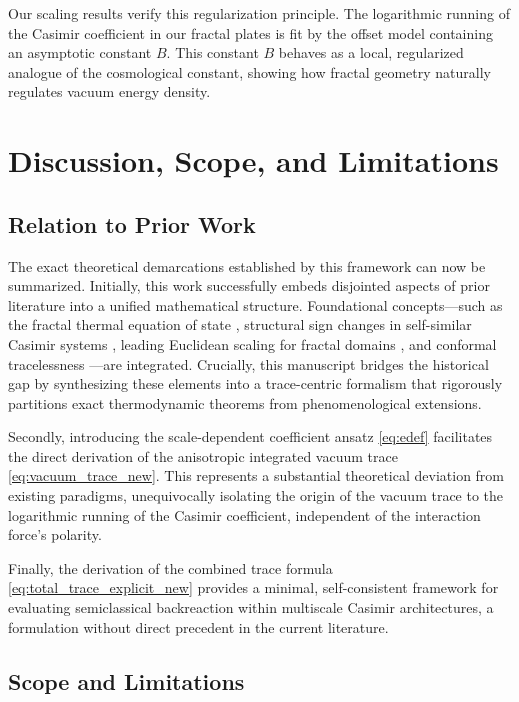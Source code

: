 \documentclass[12pt,letterpaper]{article}
\begin{document}
Our scaling results verify this regularization principle. The logarithmic running of the Casimir coefficient in our fractal plates is fit by the offset model containing an asymptotic constant $B$. This constant $B$ behaves as a local, regularized analogue of the cosmological constant, showing how fractal geometry naturally regulates vacuum energy density.


\section{Discussion, Scope, and Limitations}
\label{sec:discussion}

\subsection{Relation to Prior Work}

The exact theoretical demarcations established by this framework can now be summarized.
Initially, this work successfully embeds disjointed aspects of prior literature into a unified mathematical structure.
Foundational concepts---such as the fractal thermal equation of state \cite{akkermans2010}, structural sign changes in self-similar Casimir systems \cite{shajesh2016,shajesh2017}, leading Euclidean scaling for fractal domains \cite{lapidus1991}, and conformal tracelessness \cite{brownmaclay1969}---are integrated.
Crucially, this manuscript bridges the historical gap by synthesizing these elements into a trace-centric formalism that rigorously partitions exact thermodynamic theorems from phenomenological extensions.

Secondly, introducing the scale-dependent coefficient ansatz \eqref{eq:edef} facilitates the direct derivation of the anisotropic integrated vacuum trace \eqref{eq:vacuum_trace_new}.
This represents a substantial theoretical deviation from existing paradigms, unequivocally isolating the origin of the vacuum trace to the logarithmic running of the Casimir coefficient, independent of the interaction force's polarity.

Finally, the derivation of the combined trace formula \eqref{eq:total_trace_explicit_new} provides a minimal, self-consistent framework for evaluating semiclassical backreaction within multiscale Casimir architectures, a formulation without direct precedent in the current literature.

\subsection{Scope and Limitations}
\end{document}
